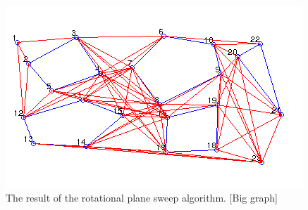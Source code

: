 \documentclass{article}
\begin{document}
\begin{figure}[!h]
\begin{center}
\includegraphics[scale=1.0]{08}
\caption{The result of the rotational plane sweep algorithm. [Big graph]}
\end{center}
\end{figure}







\end{document}
